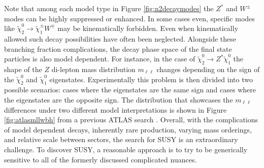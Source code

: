 Note that among each model type in Figure \ref{fig:n2decaymodes} the $Z^*$ and $W^\pm$ modes can be highly suppressed or enhanced. In some cases even, specific modes like $\tilde{\chi}^0_2\rightarrow \tilde{\chi}_1^\pm W^\mp$ may be kinematically forbidden. Even when kinematically allowed such decay possibilities have often been neglected. Alongside these branching fraction complications, the decay phase space of the final state particles is also model dependent. For instance, in the case of $\tilde{\chi}^0_2 \rightarrow Z^*\tilde{\chi}^0_1 $ the shape of the $Z$ di-lepton mass distribution $m_{\ell\ell}$  changes depending on the sign of the $\tilde{\chi}_2^0$ and $\tilde{\chi}_1^0$ eigenstates. Experimentally this problem is then divided into two possible scenarios: cases where the eigenstates are the same sign and cases where the eigenstates are the opposite sign. The distribution that showcases the $m_{\ell\ell}$ differences under two different model interpretations is shown in Figure \ref{fig:atlasmllwbh} from a previous ATLAS search \cite{ATLAS:2019lng}. Overall, with the complications of model dependent decays, inherently rare production, varying mass orderings, and relative scale between sectors, the search for SUSY is an extraordinary challenge. To discover SUSY, a reasonable approach is to try to be generically sensitive to all of the formerly discussed complicated nuances. 






